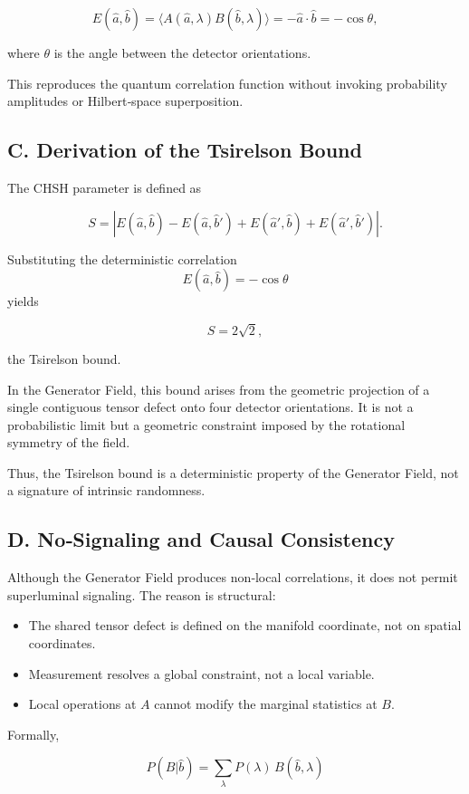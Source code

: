 \documentclass[reprint,amsmath,amssymb,aps,prl,floatfix]{revtex4-2}
\begin{document}
\[
E(\hat{a},\hat{b}) = \langle A(\hat{a},\lambda)B(\hat{b},\lambda)\rangle
= -\hat{a}\cdot\hat{b}
= -\cos\theta,
\]

where \(\theta\) is the angle between the detector orientations.

This reproduces the quantum correlation function without invoking probability amplitudes or Hilbert‑space superposition.

\subsection{C. Derivation of the Tsirelson Bound}

The CHSH parameter is defined as
\medskip

\[
S = |E(\hat{a},\hat{b}) - E(\hat{a},\hat{b}')
+ E(\hat{a}',\hat{b}) + E(\hat{a}',\hat{b}')|.
\]

Substituting the deterministic correlation  
\[
E(\hat{a},\hat{b}) = -\cos\theta
\]
yields

\[
S = 2\sqrt{2},
\]

the Tsirelson bound.

In the Generator Field, this bound arises from the geometric projection of a single contiguous tensor defect onto four detector orientations. It is not a probabilistic limit but a geometric constraint imposed by the rotational symmetry of the field.

Thus, the Tsirelson bound is a deterministic property of the Generator Field, not a signature of intrinsic randomness.

\subsection{D. No‑Signaling and Causal Consistency}

Although the Generator Field produces non‑local correlations, it does not permit superluminal signaling. The reason is structural:
\begin{itemize}
\item The shared tensor defect is defined on the manifold coordinate, not on spatial coordinates.  
\item Measurement resolves a global constraint, not a local variable.  
\item Local operations at \(A\) cannot modify the marginal statistics at \(B\).  
\end{itemize}
\medskip

Formally,
\medskip

\[
P(B|\hat{b}) = \sum_{\lambda} P(\lambda)\,B(\hat{b},\lambda)
\]
\end{document}
